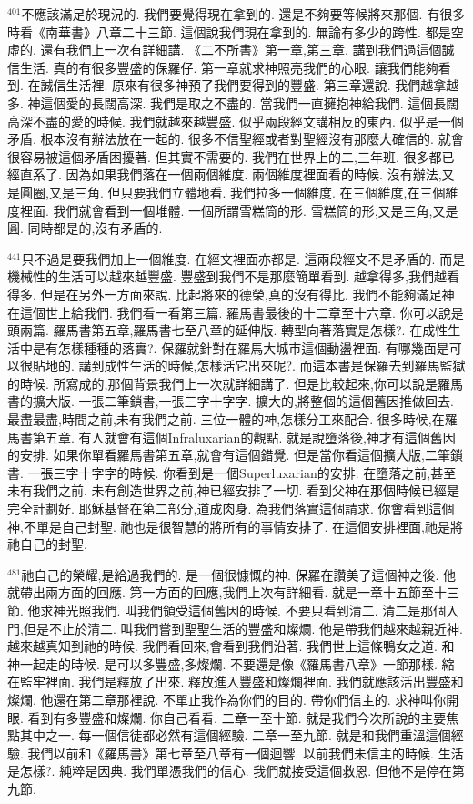 \documentclass{book}
\begin{document}
$^{401}$不應該滿足於現況的.
我們要覺得現在拿到的.
還是不夠要等候將來那個.
有很多時看《南華書》八章二十三節.
這個說我們現在拿到的.
無論有多少的跨性.
都是空虛的.
還有我們上一次有詳細講.
《二不所書》第一章,第三章.
講到我們過這個誠信生活.
真的有很多豐盛的保羅仔.
第一章就求神照亮我們的心眼.
讓我們能夠看到.
在誠信生活裡.
原來有很多神預了我們要得到的豐盛.
第三章還說.
我們越拿越多.
神這個愛的長闊高深.
我們是取之不盡的.
當我們一直擁抱神給我們.
這個長闊高深不盡的愛的時候.
我們就越來越豐盛.
似乎兩段經文講相反的東西.
似乎是一個矛盾.
根本沒有辦法放在一起的.
很多不信聖經或者對聖經沒有那麼大確信的.
就會很容易被這個矛盾困擾著.
但其實不需要的.
我們在世界上的二,三年班.
很多都已經直系了.
因為如果我們落在一個兩個維度.
兩個維度裡面看的時候.
沒有辦法,又是圓圈,又是三角.
但只要我們立體地看.
我們拉多一個維度.
在三個維度,在三個維度裡面.
我們就會看到一個堆體.
一個所謂雪糕筒的形.
雪糕筒的形,又是三角,又是圓.
同時都是的,沒有矛盾的.

$^{441}$只不過是要我們加上一個維度.
在經文裡面亦都是.
這兩段經文不是矛盾的.
而是機械性的生活可以越來越豐盛.
豐盛到我們不是那麼簡單看到.
越拿得多,我們越看得多.
但是在另外一方面來說.
比起將來的德榮,真的沒有得比.
我們不能夠滿足神在這個世上給我們.
我們看一看第三篇.
羅馬書最後的十二章至十六章.
你可以說是頭兩篇.
羅馬書第五章,羅馬書七至八章的延伸版.
轉型向著落實是怎樣?.
在成性生活中是有怎樣種種的落實?.
保羅就針對在羅馬大城市這個動盪裡面.
有哪幾面是可以很貼地的.
講到成性生活的時候,怎樣活它出來呢?.
而這本書是保羅去到羅馬監獄的時候.
所寫成的,那個背景我們上一次就詳細講了.
但是比較起來,你可以說是羅馬書的擴大版.
一張二筆鎖書,一張三字十字字.
擴大的,將整個的這個舊因推做回去.
最盡最盡,時間之前,未有我們之前.
三位一體的神,怎樣分工來配合.
很多時候,在羅馬書第五章.
有人就會有這個Infraluxarian的觀點.
就是說墮落後,神才有這個舊因的安排.
如果你單看羅馬書第五章,就會有這個錯覺.
但是當你看這個擴大版,二筆鎖書.
一張三字十字字的時候.
你看到是一個Superluxarian的安排.
在墮落之前,甚至未有我們之前.
未有創造世界之前,神已經安排了一切.
看到父神在那個時候已經是完全計劃好.
耶穌基督在第二部分,道成肉身.
為我們落實這個請求.
你會看到這個神,不單是自己封聖.
祂也是很智慧的將所有的事情安排了.
在這個安排裡面,祂是將祂自己的封聖.

$^{481}$祂自己的榮耀,是給過我們的.
是一個很慷慨的神.
保羅在讚美了這個神之後.
他就帶出兩方面的回應.
第一方面的回應,我們上次有詳細看.
就是一章十五節至十三節.
他求神光照我們.
叫我們領受這個舊因的時候.
不要只看到清二.
清二是那個入門,但是不止於清二.
叫我們嘗到聖聖生活的豐盛和燦爛.
他是帶我們越來越親近神.
越來越真知到祂的時候.
我們看回來,會看到我們沿著.
我們世上這條鴨女之道.
和神一起走的時候.
是可以多豐盛,多燦爛.
不要還是像《羅馬書八章》一節那樣.
縮在監牢裡面.
我們是釋放了出來.
釋放進入豐盛和燦爛裡面.
我們就應該活出豐盛和燦爛.
他還在第二章那裡說.
不單止我作為你們的目的.
帶你們信主的.
求神叫你開眼.
看到有多豐盛和燦爛.
你自己看看.
二章一至十節.
就是我們今次所說的主要焦點其中之一.
每一個信徒都必然有這個經驗.
二章一至九節.
就是和我們重溫這個經驗.
我們以前和《羅馬書》第七章至八章有一個迴響.
以前我們未信主的時候.
生活是怎樣?.
純粹是因典.
我們單憑我們的信心.
我們就接受這個救恩.
但他不是停在第九節.
\end{document}
